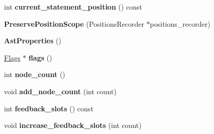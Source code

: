 \begin{DoxyCompactItemize}
\item 
\hypertarget{classv8_1_1internal_1_1_b_a_s_e___e_m_b_e_d_d_e_d_a4b5b4a6f6e017f6e4eed945a4b3d59dd}{}int {\bfseries current\+\_\+statement\+\_\+position} () const \label{classv8_1_1internal_1_1_b_a_s_e___e_m_b_e_d_d_e_d_a4b5b4a6f6e017f6e4eed945a4b3d59dd}

\item 
\hypertarget{classv8_1_1internal_1_1_b_a_s_e___e_m_b_e_d_d_e_d_adcb6a749895e4f49ce37dc964f4239ea}{}{\bfseries Preserve\+Position\+Scope} (Positions\+Recorder $\ast$positions\+\_\+recorder)\label{classv8_1_1internal_1_1_b_a_s_e___e_m_b_e_d_d_e_d_adcb6a749895e4f49ce37dc964f4239ea}

\item 
\hypertarget{classv8_1_1internal_1_1_b_a_s_e___e_m_b_e_d_d_e_d_a1ab46cdc73535df1d57aa945c2aac453}{}{\bfseries Ast\+Properties} ()\label{classv8_1_1internal_1_1_b_a_s_e___e_m_b_e_d_d_e_d_a1ab46cdc73535df1d57aa945c2aac453}

\item 
\hypertarget{classv8_1_1internal_1_1_b_a_s_e___e_m_b_e_d_d_e_d_a9ef90cdf6525913c0c79c674cc2921e3}{}\hyperlink{classv8_1_1internal_1_1_b_a_s_e___e_m_b_e_d_d_e_d_1_1_flags}{Flags} $\ast$ {\bfseries flags} ()\label{classv8_1_1internal_1_1_b_a_s_e___e_m_b_e_d_d_e_d_a9ef90cdf6525913c0c79c674cc2921e3}

\item 
\hypertarget{classv8_1_1internal_1_1_b_a_s_e___e_m_b_e_d_d_e_d_a5a0619fb2187f9b2bd53c32b646b0bec}{}int {\bfseries node\+\_\+count} ()\label{classv8_1_1internal_1_1_b_a_s_e___e_m_b_e_d_d_e_d_a5a0619fb2187f9b2bd53c32b646b0bec}

\item 
\hypertarget{classv8_1_1internal_1_1_b_a_s_e___e_m_b_e_d_d_e_d_af50144630cae92fab16fd2c1f701467c}{}void {\bfseries add\+\_\+node\+\_\+count} (int count)\label{classv8_1_1internal_1_1_b_a_s_e___e_m_b_e_d_d_e_d_af50144630cae92fab16fd2c1f701467c}

\item 
\hypertarget{classv8_1_1internal_1_1_b_a_s_e___e_m_b_e_d_d_e_d_af9cec0a003da4314faa215bec80a0598}{}int {\bfseries feedback\+\_\+slots} () const \label{classv8_1_1internal_1_1_b_a_s_e___e_m_b_e_d_d_e_d_af9cec0a003da4314faa215bec80a0598}

\item 
\hypertarget{classv8_1_1internal_1_1_b_a_s_e___e_m_b_e_d_d_e_d_ad9b25554bfafe868ad21304db461801b}{}void {\bfseries increase\+\_\+feedback\+\_\+slots} (int count)\label{classv8_1_1internal_1_1_b_a_s_e___e_m_b_e_d_d_e_d_ad9b25554bfafe868ad21304db461801b}


\end{DoxyCompactItemize}
